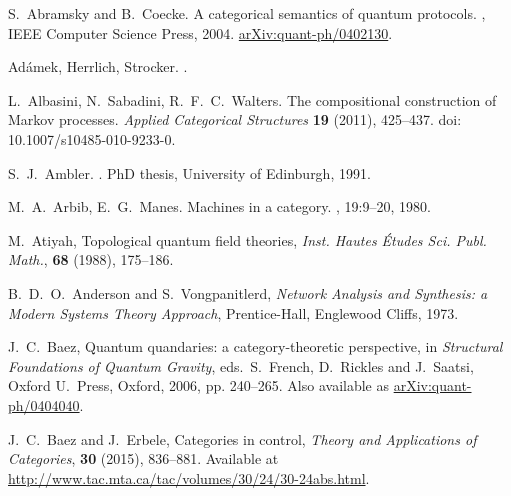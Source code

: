 \begin{thebibliography}{RSW00}

    S.\ Abramsky and B.\ Coecke.
    \newblock A categorical semantics of quantum protocols.
    , IEEE Computer Science Press, 2004.
    \newblock \href{http://arxiv.org/abs/quant-ph/0402130}{arXiv:quant-ph/0402130}.

    Ad\'amek, Herrlich, Strocker. 
    .



    L.\ Albasini, N.\ Sabadini, R.\ F.\ C.\ Walters. 
    \newblock The compositional construction of Markov processes.
    \newblock \emph{Applied Categorical Structures} {\bf 19} (2011), 425--437. 
    \newblock doi: 10.1007/s10485-010-9233-0.

    S.\ J.\ Ambler. 
    . 
    \newblock PhD thesis, University of Edinburgh, 1991.

    M.\ A.\ Arbib, E.\ G.\ Manes. 
    \newblock Machines in a category.
    , 19:9--20, 1980.


     M.\ Atiyah, Topological quantum field theories,
    {\sl Inst. Hautes \'Etudes Sci. Publ. Math.}, {\bf 68} (1988), 175--186. 

     B.\ D.\ O.\ Anderson and S.\ Vongpanitlerd, {\sl Network Analysis and 
    Synthesis: a Modern Systems Theory Approach}, Prentice-Hall, Englewood Cliffs, 
    1973.

     J.\ C.\ Baez, Quantum quandaries: a category-theoretic
    perspective, in {\sl Structural Foundations of Quantum Gravity}, eds.\
    S.\ French, D.\ Rickles and J.\ Saatsi, Oxford U.\ Press, Oxford,
    2006, pp.  240--265. Also available as \href{http://arxiv.org/abs/quant-ph/0404040}
    {arXiv:quant-ph/0404040}.

     J.\ C.\ Baez and J.\ Erbele, Categories in control, {\sl Theory
    and Applications of Categories}, {\bf 30} (2015), 836--881. Available at
    \href{http://www.tac.mta.ca/tac/volumes/30/24/30-24abs.html}{http://www.tac.mta.ca/tac/volumes/30/24/30-24abs.html}.


\end{thebibliography}

